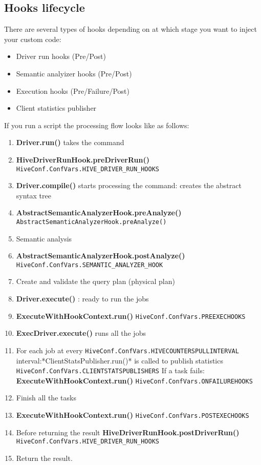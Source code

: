 \documentclass[11pt]{article}
\begin{document}
\subsection{Hooks lifecycle}
\label{sec:orgdb0e80e}
There are several types of hooks depending on at which stage you want to inject your custom code:
\begin{itemize}
\item Driver run hooks (Pre/Post)
\item Semantic analyizer hooks (Pre/Post)
\item Execution hooks (Pre/Failure/Post)
\item Client statistics publisher
\end{itemize}
If you run a script the processing flow looks like as follows:
\begin{enumerate}
\item \textbf{Driver.run()} takes the command
\item \textbf{HiveDriverRunHook.preDriverRun()} \texttt{HiveConf.ConfVars.HIVE\_DRIVER\_RUN\_HOOKS}
\item \textbf{Driver.compile()} starts processing the command: creates the abstract syntax tree
\item \textbf{AbstractSemanticAnalyzerHook.preAnalyze()} \texttt{AbstractSemanticAnalyzerHook.preAnalyze()}
\item Semantic analysis
\item \textbf{AbstractSemanticAnalyzerHook.postAnalyze()} \texttt{HiveConf.ConfVars.SEMANTIC\_ANALYZER\_HOOK}
\item Create and validate the query plan (physical plan)
\item \textbf{Driver.execute()} : ready to run the jobs
\item \textbf{ExecuteWithHookContext.run()}  \texttt{HiveConf.ConfVars.PREEXECHOOKS}
\item \textbf{ExecDriver.execute()} runs all the jobs
\item For each job at every \texttt{HiveConf.ConfVars.HIVECOUNTERSPULLINTERVAL} interval:*ClientStatsPublisher.run()* is called to publish statistics \texttt{HiveConf.ConfVars.CLIENTSTATSPUBLISHERS} If a task fails: \textbf{ExecuteWithHookContext.run()} \texttt{HiveConf.ConfVars.ONFAILUREHOOKS}
\item Finish all the tasks
\item \textbf{ExecuteWithHookContext.run()} \texttt{HiveConf.ConfVars.POSTEXECHOOKS}
\item Before returning the result \textbf{HiveDriverRunHook.postDriverRun()} \texttt{HiveConf.ConfVars.HIVE\_DRIVER\_RUN\_HOOKS}
\item Return the result.
\end{enumerate}
\end{document}
